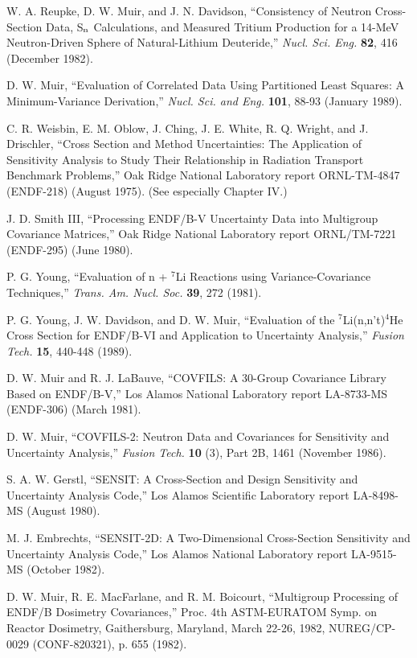 \documentclass[11pt,twoside]{NJOYMan}
\begin{document}
\begin{thebibliography}{99}
\begin{singlespace}
 W. A. Reupke, D. W. Muir, and J. N. Davidson,
  ``Consistency of Neutron Cross-Section Data, S$_{\rm{n}}$ Calculations,
  and Measured Tritium Production for a 14-MeV Neutron-Driven Sphere of
  Natural-Lithium Deuteride,'' {\it Nucl. Sci. Eng.} {\bf 82}, 416 (December
  1982).

 D. W. Muir, ``Evaluation of Correlated Data Using
  Partitioned Least Squares: A Minimum-Variance Derivation,'' {\it Nucl.
  Sci. and Eng.} {\bf 101}, 88-93 (January 1989).

 C. R. Weisbin, E. M. Oblow, J. Ching, J. E. White, R.
  Q. Wright, and J. Drischler, ``Cross Section and Method Uncertainties:
  The Application of Sensitivity Analysis to Study Their Relationship in
  Radiation Transport Benchmark Problems,'' Oak Ridge National Laboratory
  report ORNL-TM-4847 (ENDF-218) (August 1975).  (See especially Chapter IV.)

 J. D. Smith III, ``Processing ENDF/B-V Uncertainty Data
  into Multigroup Covariance Matrices,'' Oak Ridge National Laboratory
  report ORNL/TM-7221 (ENDF-295) (June 1980).

 P. G. Young, ``Evaluation of n + $^7$Li Reactions
  using Variance-Covariance Techniques,'' {\it Trans. Am. Nucl. Soc.}
  {\bf 39}, 272 (1981).

 P. G. Young, J. W. Davidson, and D. W. Muir,
  ``Evaluation of the $^7$Li(n,n't)$^4$He Cross Section for ENDF/B-VI and
  Application to Uncertainty Analysis,'' {\it Fusion Tech.} {\bf 15},
  440-448 (1989).

 D. W. Muir and R. J. LaBauve, ``COVFILS: A 30-Group
  Covariance Library Based on ENDF/B-V,'' Los Alamos National Laboratory
  report LA-8733-MS (ENDF-306)  (March 1981).

 D. W. Muir, ``COVFILS-2: Neutron Data and Covariances
  for Sensitivity and Uncertainty Analysis,'' {\it Fusion Tech.} {\bf 10}
  (3), Part 2B, 1461 (November 1986).

 S. A. W. Gerstl, ``SENSIT: A Cross-Section and Design
  Sensitivity and Uncertainty Analysis Code,'' Los Alamos Scientific
  Laboratory report LA-8498-MS (August 1980).

 M. J. Embrechts, ``SENSIT-2D: A Two-Dimensional
  Cross-Section Sensitivity and Uncertainty Analysis Code,'' Los Alamos
  National Laboratory report LA-9515-MS (October 1982).

 D. W. Muir, R. E. MacFarlane, and R. M. Boicourt,
  ``Multigroup Processing of ENDF/B Dosimetry Covariances,'' Proc. 4th
  ASTM-EURATOM Symp. on Reactor Dosimetry, Gaithersburg, Maryland, March
  22-26, 1982, NUREG/CP-0029 (CONF-820321), p. 655 (1982).


\end{singlespace}
\end{thebibliography}
\end{document}
